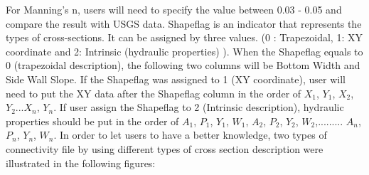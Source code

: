 \documentclass[12pt, letterpaper]{article}
\begin{document}
\begin{flushleft} %
For Manning's n, users will need to specify the value between 0.03 - 0.05 and compare the result with USGS data. Shapeflag is an indicator that represents the types of cross-sections. It can be assigned by three values. (0 : Trapezoidal, 1: XY coordinate and 2: Intrinsic (hydraulic properties) ). When the Shapeflag equals to 0 (trapezoidal description), the following two columns will be Bottom Width and Side Wall Slope. If the Shapeflag was assigned to 1 (XY coordinate), user will need to put the XY data after the Shapeflag column in the order of $X_1$, $Y_1$, $X_2$, $Y_2$...$X_n$, $Y_n$. If user assign the Shapeflag to 2 (Intrinsic description), hydraulic properties should be put in the order of $A_1$, $P_1$, $Y_1$, $W_1$, $A_2$, $P_2$, $Y_2$, $W_2$,......... $A_n$, $P_n$, $Y_n$, $W_n$.
In order to let users to have a better knowledge, two types of connectivity file by using different types of cross section description were illustrated in the following figures:
\end{flushleft} %
\end{document}
